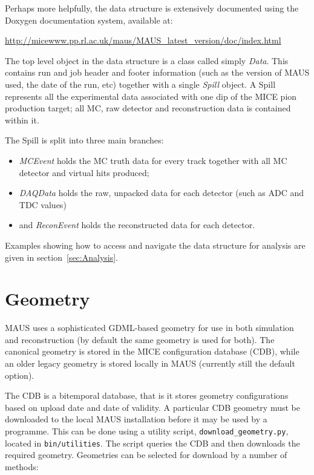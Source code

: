\documentclass[a4paper,10pt]{article}
\begin{document}
Perhaps more helpfully, the data structure is extensively documented using the Doxygen documentation system, available at:

\url{http://micewww.pp.rl.ac.uk/maus/MAUS_latest_version/doc/index.html}

The top level object in the data structure is a class called simply \textit{Data}. This contains run and job header and footer information (such as the version of MAUS used, the date of the run, etc) together with a single \textit{Spill} object. A Spill represents all the experimental data associated with one dip of the MICE pion production target; all MC, raw detector and reconstruction data is contained within it.

The Spill is split into three main branches: 

\begin{itemize}
  \item \textit{MCEvent} holds the MC truth data for every track together with all MC detector and virtual hits produced;
  \item \textit{DAQData} holds the raw, unpacked data for each detector (such as ADC and TDC values)
  \item and \textit{ReconEvent} holds the reconstructed data for each detector.
\end{itemize}

Examples showing how to access and navigate the data structure for analysis are given in section~\ref{sec:Analysis}.

\section{Geometry}
\label{sec:Geometry}
MAUS uses a sophisticated GDML-based geometry for use in both simulation and reconstruction (by default the same geometry is used for both).  The canonical geometry is stored in the MICE configuration database (CDB), while an older legacy geometry is stored locally in MAUS (currently still the default option).

The CDB is a bitemporal database, that is it stores geometry configurations based on upload date and date of validity.  A particular CDB geometry must be downloaded to the local MAUS installation before it may be used by a programme.  This can be done using a utility script, \texttt{download\_geometry.py}, located in \texttt{bin/utilities}.  The script queries the CDB and then downloads the required geometry.  Geometries can be selected for download by a number of methods:
\end{document}
